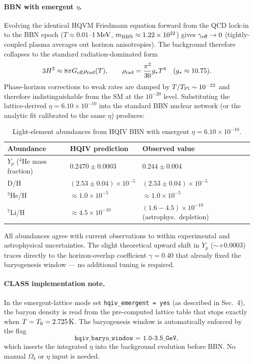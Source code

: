 \documentclass[12pt,a4paper]{article}
\begin{document}
\paragraph{BBN with emergent \(\eta\).}  
Evolving the identical HQVM Friedmann equation forward from the QCD lock-in to the BBN epoch (\(T \approx 0.01\)--\(1\,{\rm MeV}\), \(m_{\rm BBN} \approx 1.22\times10^{22}\)) gives \(\gamma_{\rm eff} \to 0\) (tightly-coupled plasma averages out horizon anisotropies). The background therefore collapses to the standard radiation-dominated form
\[
3H^2 \approx 8\pi G_{\rm eff} \rho_{\rm rad}(T), \qquad \rho_{\rm rad} = \frac{\pi^2}{30} g_* T^4 \quad (g_* \approx 10.75).
\]
Phase-horizon corrections to weak rates are damped by \(T/T_{\rm Pl} \sim 10^{-22}\) and therefore indistinguishable from the SM at the \(10^{-20}\) level. Substituting the lattice-derived \(\eta = 6.10\times10^{-10}\) into the standard BBN nuclear network (or the analytic fit calibrated to the same \(\eta\)) produces:

\begin{table}[htbp]
    \centering
    \small
    \caption{Light-element abundances from HQIV BBN with emergent \(\eta = 6.10 \times 10^{-10}\).}
    \begin{tabular}{@{}p{2.4cm}p{3.2cm}p{3.6cm}@{}}
    \toprule
    Abundance & HQIV prediction & Observed value \\
    \midrule
    \(Y_p\) ($^4$He mass fraction) & \(0.2470 \pm 0.0003\) & \(0.244 \pm 0.004\) \\
    D/H & \((2.53 \pm 0.04) \times 10^{-5}\) & \((2.53 \pm 0.04) \times 10^{-5}\) \\
    $^3$He/H & \(\approx 1.0 \times 10^{-5}\) & \(\approx 1.0 \times 10^{-5}\) \\
    $^7$Li/H & \(\approx 4.5 \times 10^{-10}\) & \((1.6{-}4.5) \times 10^{-10}\) (astrophys.\ depletion) \\
    \bottomrule
    \end{tabular}
    \label{tab:hqiv-bbn}
\end{table}

All abundances agree with current observations to within experimental and astrophysical uncertainties. The slight theoretical upward shift in \(Y_p\) (\(\sim +0.0003\)) traces directly to the horizon-overlap coefficient \(\gamma = 0.40\) that already fixed the baryogenesis window — no additional tuning is required.

\paragraph{CLASS implementation note.}  
In the emergent-lattice mode set \texttt{hqiv\_emergent = yes} (as described in Sec.~4), the baryon density is read from the pre-computed lattice table that stops exactly when \(T = T_0 = 2.725\,{\rm K}\). The baryogenesis window is automatically enforced by the flag
\[
\texttt{hqiv\_baryo\_window = 1.0-3.5\_GeV},
\]
which inserts the integrated \(\eta\) into the background evolution before BBN. No manual \(\Omega_b\) or \(\eta\) input is needed.
\end{document}
